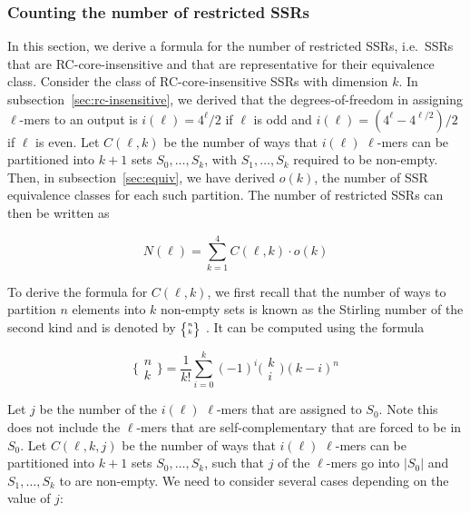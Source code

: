 \documentclass[
  11pt,
  twoside]{scrbook}
\begin{document}
\hypertarget{counting-the-number-of-restricted-ssrs}{%
\subsubsection{Counting the number of restricted SSRs}\label{counting-the-number-of-restricted-ssrs}}

In this section, we derive a formula for the number of restricted SSRs, i.e.~SSRs that are RC-core-insensitive and that are representative for their equivalence class. Consider the class of RC-core-insensitive SSRs with dimension \(k\). In subsection~\ref{sec:rc-insensitive}, we derived that the degrees-of-freedom in assigning \(\ell\)-mers to an output is \(i(\ell) = 4^\ell/2\) if \(\ell\) is odd and \(i(\ell) = (4^\ell - 4^{\ell / 2})/2\) if \(\ell\) is even. Let \(C(\ell,k)\) be the number of ways that \(i(\ell)\) \(\ell\)-mers can be partitioned into \(k+1\) sets \(S_0, \ldots, S_k\), with \(S_1, \ldots, S_k\) required to be non-empty. Then, in subsection~\ref{sec:equiv}, we have derived \(o(k)\), the number of SSR equivalence classes for each such partition. The number of restricted SSRs can then be written as

\begin{equation}
N(\ell) = \sum_{k=1}^{4} C(\ell, k) \cdot o(k)
\label{eq:N}
\end{equation}

To derive the formula for \(C(\ell, k)\), we first recall that the number of ways to partition \(n\) elements into \(k\) non-empty sets is known as the Stirling number of the second kind and is denoted by \(\tiny\bigg\{%
\begin{matrix}
    n \\
    k
\end{matrix}
\bigg\} \) \autocite[p.265]{grahamConcreteMathematicsFoundation1994}. It can be computed using the formula

\begin{equation*}
    \bigg\{%
\begin{matrix}
    n \\
    k
\end{matrix}
\bigg\}  = \frac{1}{k!}\sum_{i=0}^k(-1)^i\bigg(
\begin{matrix}
    k \\
    i
\end{matrix}
\bigg) (k-i)^n
\end{equation*}

Let \(j\) be the number of the \(i(\ell)\) \(\ell\)-mers that are assigned to \(S_0\). Note this does not include the \(\ell\)-mers that are self-complementary that are forced to be in \(S_0\). Let \(C(\ell,k,j)\) be the number of ways that \(i(\ell)\) \(\ell\)-mers can be partitioned into \(k+1\) sets \(S_0, \ldots, S_k\), such that \(j\) of the \(\ell\)-mers go into \(|S_0|\) and \(S_1, \ldots, S_k\) to are non-empty. We need to consider several cases depending on the value of \(j\):
\end{document}

